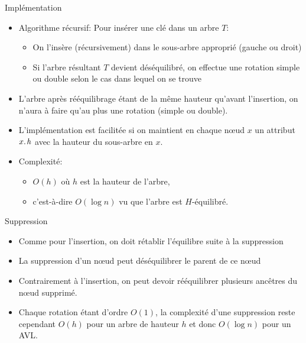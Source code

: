 \begin{frame}{Implémentation}
\begin{itemize}
\item Algorithme récursif: Pour insérer une clé dans un arbre $T$:
\begin{itemize}
\item On l'insère (récursivement) dans le sous-arbre approprié (gauche ou droit)
\item Si l'arbre résultant $T$ devient déséquilibré, on effectue une rotation simple ou double selon le cas dans lequel on se trouve
\end{itemize}
\item L'arbre après rééquilibrage étant de la même hauteur qu'avant l'insertion, on n'aura à faire qu'au plus une rotation (simple ou double).
\item L'implémentation est facilitée si on maintient en chaque n\oe ud $x$ un attribut $\attrib{x}{h}$ avec la hauteur du sous-arbre en $x$.
\item Complexité:
\begin{itemize}
\item $O(h)$ où $h$ est la hauteur de l'arbre,
\item c'est-à-dire $O(\log n)$ vu que l'arbre est $H$-équilibré.
\end{itemize}
\end{itemize}
\end{frame}

\begin{frame}{Suppression}
\begin{itemize}
\item Comme pour l'insertion, on doit rétablir l'équilibre suite à la suppression
\item La suppression d'un n\oe ud peut déséquilibrer le parent de ce n\oe ud
\item Contrairement à l'insertion, on peut devoir rééquilibrer plusieurs ancêtres du n\oe ud supprimé.
\item Chaque rotation étant d'ordre $O(1)$, la complexité d'une suppression reste cependant $O(h)$ pour un arbre de hauteur $h$ et donc $O(\log n)$ pour un AVL.
\end{itemize}
\end{frame}

